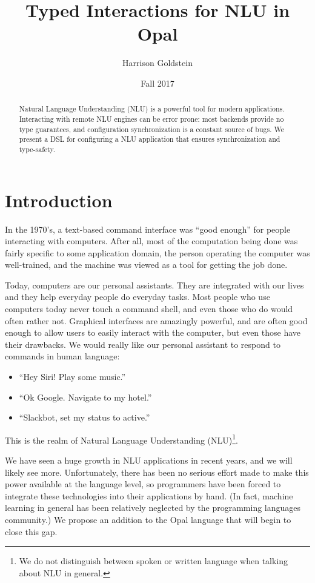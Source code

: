 \documentclass[twocolumn]{article}
\title{Typed Interactions for NLU in Opal}
\author{Harrison Goldstein}
\date{Fall 2017}
\begin{document}
\maketitle

\begin{abstract}
  Natural Language Understanding (NLU) is a powerful tool for modern
  applications. Interacting with remote NLU engines can be error prone: most
  backends provide no type guarantees, and configuration synchronization is a
  constant source of bugs. We present a DSL for configuring a NLU application
  that ensures synchronization and type-safety.
\end{abstract}

\section{Introduction} \label{introduction}
In the 1970's, a text-based command interface was ``good enough'' for people
interacting with computers. After all, most of the computation being done was
fairly specific to some application domain, the person operating the computer
was well-trained, and the machine was viewed as a tool for getting the job done.

Today, computers are our personal assistants. They are integrated with our lives
and they help everyday people do everyday tasks. Most people who use computers
today never touch a command shell, and even those who do would often rather not.
Graphical interfaces are amazingly powerful, and are often good enough to allow
users to easily interact with the computer, but even those have their drawbacks.
We would really like our personal assistant to respond to commands in human
language:
\begin{itemize}
\item ``Hey Siri! Play some music.''
\item ``Ok Google. Navigate to my hotel.''
\item ``Slackbot, set my status to active.''
\end{itemize}
This is the realm of Natural Language Understanding (NLU)\footnote{We do not
  distinguish between spoken or written language when talking about NLU in
  general.}.

We have seen a huge growth in NLU applications in recent years, and we will
likely see more. Unfortunately, there has been no serious effort made to make
this power available at the language level, so programmers have been forced to
integrate these technologies into their applications by hand. (In fact, machine
learning in general has been relatively neglected by the programming languages
community.) We propose an addition to the Opal language that will begin to close
this gap.
\end{document}
